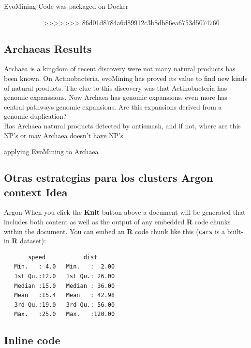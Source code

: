 \documentclass[12pt,twoside]{reedthesis}
\begin{document}
  EvoMining Code was packaged on Docker
  
=======
>>>>>>> 86d01d8784a6d89912c3b8db86ea6753d5074760
  \subsection{Archaeas Results}\label{archaeas-results}
  
  Archaea is a kingdom of recent discovery were not many natural products
  has been known. On Actinobacteria, evoMining has proved its value to
  find new kinds of natural products. The clue to this discovery was that
  Actinobacteria has genomic expanssions. Now Archaea has genomic
  expansions, even more has central pathways genomic expansions. Are this
  expansions derived from a genomic duplication?\\
  Has Archaea natural products detected by antismash, and if not, where
  are this NP's or may Archaea doesn't have NP's.
  
  applying EvoMining to Archaea
  
  \subsection{Otras estrategias para los clusters Argon context
  Idea}\label{otras-estrategias-para-los-clusters-argon-context-idea}
  
  Argon When you click the \textbf{Knit} button above a document will be
  generated that includes both content as well as the output of any
  embedded \textbf{R} code chunks within the document. You can embed an
  \textbf{R} code chunk like this (\texttt{cars} is a built-in \textbf{R}
  dataset):
  
  \begin{Shaded}
  \begin{Highlighting}[]
  \end{Highlighting}
  \end{Shaded}
  
  \begin{verbatim}
       speed           dist       
   Min.   : 4.0   Min.   :  2.00  
   1st Qu.:12.0   1st Qu.: 26.00  
   Median :15.0   Median : 36.00  
   Mean   :15.4   Mean   : 42.98  
   3rd Qu.:19.0   3rd Qu.: 56.00  
   Max.   :25.0   Max.   :120.00  
  \end{verbatim}
  
  \subsection{Inline code}\label{inline-code}
  
\end{document}
